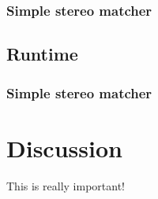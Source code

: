 \subsubsection{Simple stereo matcher}

\subsection{Runtime}

\subsubsection{Simple stereo matcher}


\section{Discussion}

This is really important!


